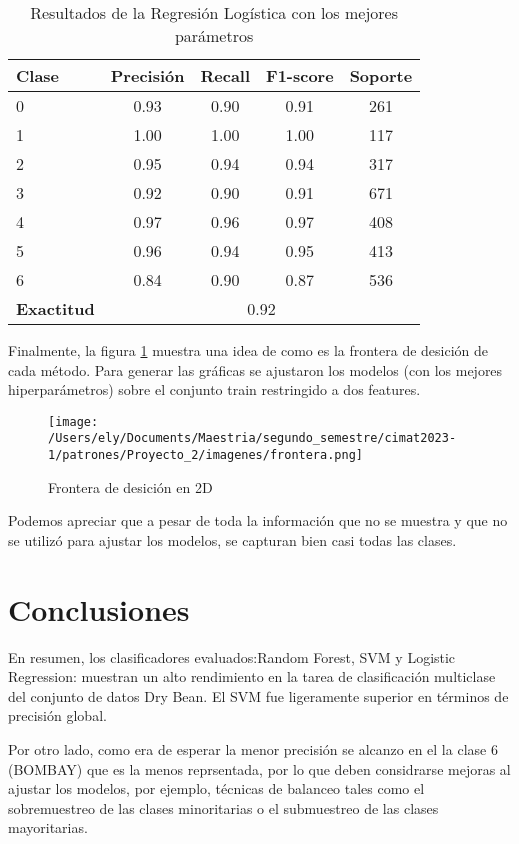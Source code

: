 \documentclass[letterpaper,spanish,reprint,nofootinbib,showkeys,aps]{revtex4-2}
\begin{document}
\begin{table}[ht]
	\centering
	\begin{tabular}{lcccc}
	\hline
	\textbf{Clase} & \textbf{Precisión} & \textbf{Recall} & \textbf{F1-score} & \textbf{Soporte} \\
	\hline
	0 & 0.93 & 0.90 & 0.91 & 261 \\
	1 & 1.00 & 1.00 & 1.00 & 117 \\
	2 & 0.95 & 0.94 & 0.94 & 317 \\
	3 & 0.92 & 0.90 & 0.91 & 671 \\
	4 & 0.97 & 0.96 & 0.97 & 408 \\
	5 & 0.96 & 0.94 & 0.95 & 413 \\
	6 & 0.84 & 0.90 & 0.87 & 536 \\
	\hline
	\textbf{Exactitud} & \multicolumn{4}{c}{0.92} \\
	\hline
	\end{tabular}
	\caption{Resultados de la Regresión Logística con los mejores parámetros}
	\label{tab:logistic_regression_results}
	\end{table}


	Finalmente, la figura \ref{front} muestra una idea de como es la frontera de desición de cada método. Para generar las gráficas se ajustaron los modelos (con los mejores hiperparámetros) sobre el conjunto train restringido a dos features. 
\begin{figure} [H]
	\begin{center}
		\texttt{[image: /Users/ely/Documents/Maestria/segundo\_semestre/cimat2023-1/patrones/Proyecto\_2/imagenes/frontera.png]}
		\caption{Frontera de desición en 2D}
		\label{front} 
   \end{center} 
\end{figure}

	Podemos apreciar que a pesar de toda la información que no se muestra y que no se utilizó para ajustar los modelos, se capturan bien casi todas las clases.
\onecolumngrid

\section{Conclusiones}


En resumen, los clasificadores evaluados:Random Forest, SVM y Logistic Regression: muestran un alto rendimiento en la tarea de clasificación multiclase del conjunto de datos Dry Bean.
El SVM fue ligeramente superior en términos de precisión global.


Por otro lado, como era de esperar la menor precisión se alcanzo en el la clase 6 (BOMBAY) que es la menos reprsentada, por lo que deben considrarse mejoras al ajustar los modelos, por ejemplo, técnicas de balanceo tales como el sobremuestreo de las clases minoritarias o el submuestreo de las clases mayoritarias.
\end{document}
